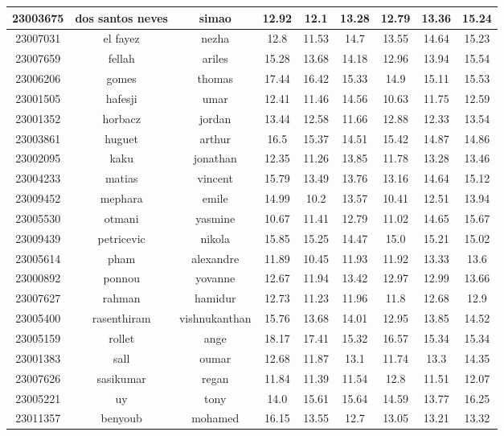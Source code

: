 \documentclass{article}%
\begin{document}
\begin{tabular}{|c|c|c|c|c|c|c|c|c|}
\hline%
23003675&dos santos neves&simao&12.92&12.1&13.28&12.79&13.36&15.24\\%
\hline%
23007031&el fayez&nezha&12.8&11.53&14.7&13.55&14.64&15.23\\%
\hline%
23007659&fellah&ariles&15.28&13.68&14.18&12.96&13.94&15.54\\%
\hline%
23006206&gomes&thomas&17.44&16.42&15.33&14.9&15.11&15.53\\%
\hline%
23001505&hafesji&umar&12.41&11.46&14.56&10.63&11.75&12.59\\%
\hline%
23001352&horbacz&jordan&13.44&12.58&11.66&12.88&12.33&13.54\\%
\hline%
23003861&huguet&arthur&16.5&15.37&14.51&15.42&14.87&14.86\\%
\hline%
23002095&kaku&jonathan&12.35&11.26&13.85&11.78&13.28&13.46\\%
\hline%
23004233&matias&vincent&15.79&13.49&13.76&13.16&14.64&15.12\\%
\hline%
23009452&mephara&emile&14.99&10.2&13.57&10.41&12.51&13.94\\%
\hline%
23005530&otmani&yasmine&10.67&11.41&12.79&11.02&14.65&15.67\\%
\hline%
23009439&petricevic&nikola&15.85&15.25&14.47&15.0&15.21&15.02\\%
\hline%
23005614&pham&alexandre&11.89&10.45&11.93&11.92&13.33&13.6\\%
\hline%
23000892&ponnou&yovanne&12.67&11.94&13.42&12.97&12.99&13.66\\%
\hline%
23007627&rahman&hamidur&12.73&11.23&11.96&11.8&12.68&12.9\\%
\hline%
23005400&rasenthiram&vishnukanthan&15.76&13.68&14.01&12.95&13.85&14.52\\%
\hline%
23005159&rollet&ange&18.17&17.41&15.32&16.57&15.34&15.34\\%
\hline%
23001383&sall&oumar&12.68&11.87&13.1&11.74&13.3&14.35\\%
\hline%
23007626&sasikumar&regan&11.84&11.39&11.54&12.8&11.51&12.07\\%
\hline%
23005221&uy&tony&14.0&15.61&15.64&14.59&13.77&16.25\\%
\hline%
23011357&benyoub&mohamed&16.15&13.55&12.7&13.05&13.21&13.32\\%
\hline%
\end{tabular}

%
\end{document}
